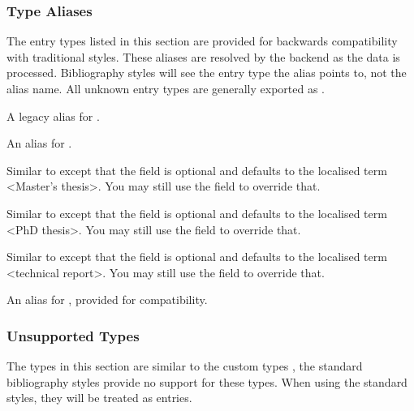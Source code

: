 \documentclass{ltxdockit}[2011/03/25]
\begin{document}
\subsubsection{Type Aliases}
\label{bib:typ:als}

The entry types listed in this section are provided for backwards compatibility with traditional \bibtex styles. These aliases are resolved by the backend as the data is processed. Bibliography styles will see the entry type the alias points to, not the alias name. All unknown entry types are generally exported as .

\begin{typelist}

 A legacy alias for .

 An alias for .

 Similar to  except that the  field is optional and defaults to the localised term <Master's thesis>. You may still use the  field to override that.

 Similar to  except that the  field is optional and defaults to the localised term <PhD thesis>. You may still use the  field to override that.

 Similar to  except that the  field is optional and defaults to the localised term <technical report>. You may still use the  field to override that.


An alias for , provided for  compatibility.

\end{typelist}

\subsubsection{Unsupported Types}
\label{bib:typ:ctm}

The types in this section are similar to the custom types , \ie the standard bibliography styles provide no support for these types. When using the standard styles, they will be treated as  entries.
\end{document}
